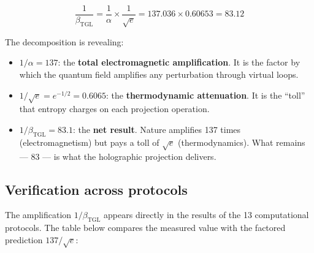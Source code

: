 \documentclass[12pt,a4paper,twoside]{article}
\newcommand{\betatgl}{\beta_{\!\scriptscriptstyle\mathrm{TGL}}}
\begin{document}
\begin{equationbox}[title={Decomposed Amplification}]
\begin{equation}
\boxed{\frac{1}{\betatgl} = \frac{1}{\alpha} \times \frac{1}{\sqrt{e}} = 137.036 \times 0.60653 = 83.12}
\label{eq:amplificacao}
\end{equation}
\end{equationbox}

The decomposition is revealing:

\begin{itemize}[nosep]
\item $1/\alpha = 137$: the \textbf{total electromagnetic amplification}. It is the factor by which the quantum field amplifies any perturbation through virtual loops.

\item $1/\sqrt{e} = e^{-1/2} = 0.6065$: the \textbf{thermodynamic attenuation}. It is the ``toll'' that entropy charges on each projection operation.

\item $1/\betatgl = 83.1$: the \textbf{net result}. Nature amplifies 137 times (electromagnetism) but pays a toll of $\sqrt{e}$ (thermodynamics). What remains --- 83 --- is what the holographic projection delivers.
\end{itemize}

\subsection{Verification across protocols}

The amplification $1/\betatgl$ appears directly in the results of the 13 computational protocols. The table below compares the measured value with the factored prediction $137/\sqrt{e}$:
\end{document}
